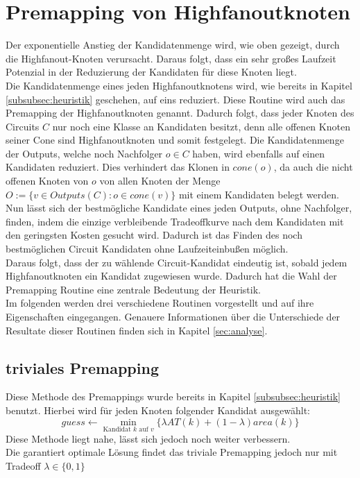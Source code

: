 \documentclass[11pt, a4paper, german]{article}
\begin{document}
 \section{Premapping von Highfanoutknoten}
 \label{sec:premapping}
Der exponentielle Anstieg der Kandidatenmenge wird, wie oben gezeigt, durch die Highfanout-Knoten verursacht. Daraus folgt, dass ein sehr großes Laufzeit Potenzial in der Reduzierung der Kandidaten für diese Knoten liegt. \\
 Die Kandidatenmenge eines jeden Highfanoutknotens wird, wie bereits in Kapitel \ref{subsubsec:heuristik} geschehen, auf eins reduziert. Diese Routine wird auch das Premapping der Highfanoutknoten genannt. Dadurch folgt, dass jeder Knoten des Circuits $C$ nur noch eine Klasse an Kandidaten besitzt, denn alle offenen Knoten seiner Cone sind Highfanoutknoten und somit festgelegt.  Die Kandidatenmenge der Outputs, welche noch Nachfolger $o \in C$ haben, wird ebenfalls auf einen Kandidaten reduziert. Dies verhindert das Klonen in $cone(o)$, da  auch die nicht offenen Knoten von $o$ von allen Knoten der Menge $O := \{ v \in Outputs(C): o \in cone(v) \}$ mit einem Kandidaten belegt werden.\\
Nun lässt sich der bestmögliche Kandidate eines jeden Outputs, ohne Nachfolger, finden, indem die einzige verbleibende Tradeoffkurve nach dem Kandidaten mit den geringsten Kosten gesucht wird. Dadurch ist das Finden des noch bestmöglichen Circuit Kandidaten ohne Laufzeiteinbußen möglich. \\
Daraus folgt, dass der zu wählende Circuit-Kandidat eindeutig ist, sobald jedem Highfanoutknoten ein Kandidat zugewiesen wurde. Dadurch hat die Wahl der Premapping Routine eine zentrale Bedeutung der Heuristik.\\
Im folgenden werden drei verschiedene Routinen vorgestellt und auf ihre Eigenschaften eingegangen. Genauere Informationen über die Unterschiede der Resultate dieser Routinen finden sich in Kapitel \ref{sec:analyse}.

\subsection{triviales Premapping}
\label{subsec:triviales_premapping}
Diese Methode des Premappings wurde bereits in Kapitel \ref{subsubsec:heuristik} benutzt. Hierbei wird für jeden Knoten folgender Kandidat ausgewählt: \[ guess \gets \min\limits_{\text{Kandidat }k\text{ auf }v}\{ \lambda AT(k) + (1-\lambda) area(k)  \} \]
Diese Methode liegt nahe, lässt sich jedoch noch weiter verbessern. \\
Die garantiert optimale Lösung findet das triviale Premapping jedoch nur mit Tradeoff $\lambda \in \{ 0,1 \}$ 
 
\end{document}
